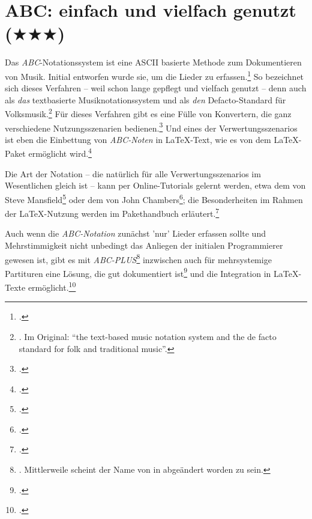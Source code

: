 %
%
%




\section{ABC: einfach und vielfach genutzt ($\bigstar\bigstar\bigstar$)}
\label{ABCMethod}
Das \textit{ABC}-Notationssystem ist eine ASCII basierte Methode zum Dokumentieren
von Musik. Initial entworfen wurde sie, um die Lieder zu
erfassen.\footcite[vgl.][\nopage Subpage 'Intro']{Chambers2018a} So bezeichnet
sich dieses Verfahren -- weil schon lange gepflegt und vielfach genutzt -- denn
auch als \textit{das} textbasierte Musiknotationssystem und als \textit{den}
Defacto-Standard für Volksmusik.\footnote{\cite[vgl.][\nopage wp.]{Abc2018a}. Im
Original: \enquote{the text-based music notation system and the de facto
standard for folk and traditional music}.} Für dieses Verfahren gibt es eine
Fülle von Konvertern, die ganz verschiedene Nutzungsszenarien
bedienen.\footcite[vgl.][\nopage wp.]{Abc2018b} Und eines der
Verwertungsszenarios ist eben die Einbettung von \textit{ABC-Noten} in
\LaTeX-Text, wie es von dem \LaTeX-Paket ermöglicht
wird.\footcite[vgl.][\nopage wp.]{CtanAbc2018a}

Die Art der Notation -- die natürlich für alle Verwertungsszenarios im
Wesentlichen gleich ist -- kann per Online-Tutorials gelernt werden, etwa dem
von Steve Mansfield\footcite[vgl.][\nopage wp.]{Mansfield2016a} oder dem von
John Chambers\footcite[vgl.][\nopage wp.]{Chambers2018a}; die Besonderheiten im
Rahmen der \LaTeX-Nutzung werden im Pakethandbuch
erläutert.\footcite[vgl.][\nopage wp.]{Gregorio2016a}

Auch wenn die \textit{ABC-Notation} zunächst 'nur' Lieder erfassen sollte und
Mehrstimmigkeit nicht unbedingt das Anliegen der initialen Programmierer gewesen
ist, gibt es mit \textit{ABC-PLUS}\footnote{\cite[vgl.][\nopage
wp.]{Gonzato2018a}. Mittlerweile scheint der Name von  in
 abgeändert worden zu sein.} inzwischen auch für mehrsystemige
Partituren eine Lösung, die gut dokumentiert
ist\footcite[vgl.][XVff]{Gonzato2018b} und die Integration in \LaTeX-Texte
ermöglicht.\footcite[vgl.][134]{Gonzato2018b}

